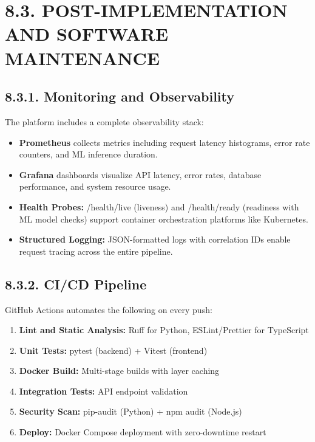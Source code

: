 \documentclass[12pt, a4paper]{report}
\begin{document}
\section{8.3. POST-IMPLEMENTATION AND SOFTWARE MAINTENANCE}
\subsection{8.3.1. Monitoring and Observability}
The platform includes a complete observability stack:

\begin{itemize}[leftmargin=*]
  \item \textbf{Prometheus} collects metrics including request latency histograms, error rate counters, and ML inference duration.
  \item \textbf{Grafana} dashboards visualize API latency, error rates, database performance, and system resource usage.
  \item \textbf{Health Probes:} /health/live (liveness) and /health/ready (readiness with ML model checks) support container orchestration platforms like Kubernetes.
  \item \textbf{Structured Logging:} JSON-formatted logs with correlation IDs enable request tracing across the entire pipeline.
\end{itemize}
\subsection{8.3.2. CI/CD Pipeline}
GitHub Actions automates the following on every push:

\begin{enumerate}[leftmargin=*]
  \item \textbf{Lint and Static Analysis:} Ruff for Python, ESLint/Prettier for TypeScript
  \item \textbf{Unit Tests:} pytest (backend) + Vitest (frontend)
  \item \textbf{Docker Build:} Multi-stage builds with layer caching
  \item \textbf{Integration Tests:} API endpoint validation
  \item \textbf{Security Scan:} pip-audit (Python) + npm audit (Node.js)
  \item \textbf{Deploy:} Docker Compose deployment with zero-downtime restart
\end{enumerate}
\end{document}

